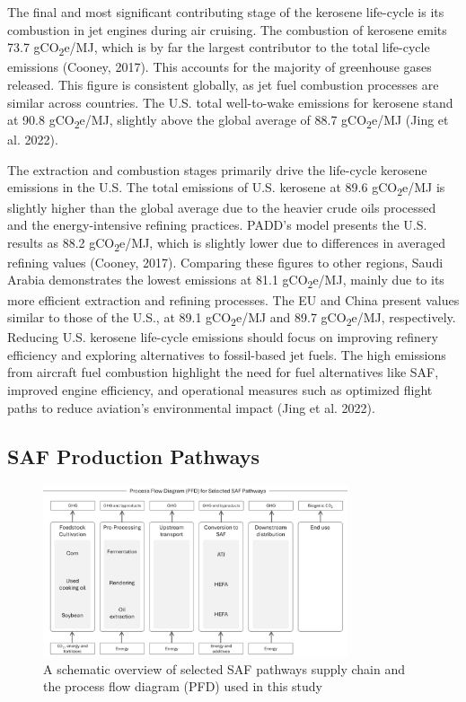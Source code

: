 \documentclass[12pt]{article}
\begin{document}
The final and most significant contributing stage of the kerosene life-cycle is its combustion in jet engines during air cruising. The combustion of kerosene emits 73.7 gCO\textsubscript{2}e/MJ, which is by far the largest contributor to the total life-cycle emissions (Cooney, 2017). This accounts for the majority of greenhouse gases released. This figure is consistent globally, as jet fuel combustion processes are similar across countries. The U.S. total well-to-wake emissions for kerosene stand at 90.8 gCO\textsubscript{2}e/MJ, slightly above the global average of 88.7 gCO\textsubscript{2}e/MJ (Jing et al. 2022).

The extraction and combustion stages primarily drive the life-cycle kerosene emissions in the U.S. The total emissions of U.S. kerosene at 89.6 gCO\textsubscript{2}e/MJ is slightly higher than the global average due to the heavier crude oils processed and the energy-intensive refining practices. PADD’s model presents the U.S. results as 88.2 gCO\textsubscript{2}e/MJ, which is slightly lower due to differences in averaged refining values (Cooney, 2017). Comparing these figures to other regions, Saudi Arabia demonstrates the lowest emissions at 81.1 gCO\textsubscript{2}e/MJ, mainly due to its more efficient extraction and refining processes. The EU and China present values similar to those of the U.S., at 89.1 gCO\textsubscript{2}e/MJ and 89.7 gCO\textsubscript{2}e/MJ, respectively. Reducing U.S. kerosene life-cycle emissions should focus on improving refinery efficiency and exploring alternatives to fossil-based jet fuels. The high emissions from aircraft fuel combustion highlight the need for fuel alternatives like SAF, improved engine efficiency, and operational measures such as optimized flight paths to reduce aviation's environmental impact (Jing et al. 2022).


\subsection{SAF Production Pathways}

\begin{figure}[H]
\centering
\includegraphics[width=0.8\textwidth]{Fig 2.png} %
\caption{A schematic overview of selected SAF pathways supply chain and the process flow diagram (PFD) used in this study}
\label{fig:figure 2}
\end{figure}
\end{document}
